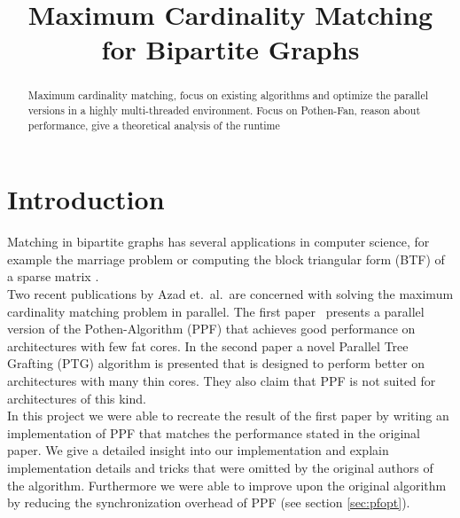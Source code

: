 \documentclass[letterpaper]{article}
\title{Maximum Cardinality Matching for Bipartite Graphs}
\begin{document}
%
\maketitle
%


\begin{abstract}

Maximum cardinality matching, focus on existing algorithms and optimize the parallel versions in a highly multi-threaded environment. Focus on Pothen-Fan, reason about performance, give a theoretical analysis of the runtime

\end{abstract}

\section{Introduction}\label{sec:intro}

Matching in bipartite graphs has several applications in computer science, for example the marriage problem or computing the block triangular 
form (BTF) of a sparse matrix \cite{Pothen:1990}.\\

Two recent publications by Azad et.\ al.\ are concerned with solving the maximum cardinality matching problem in parallel. 
The first paper~\cite{Azad:2012} presents a parallel version of the Pothen-Algorithm (PPF) that achieves good performance 
on architectures with few fat cores. In the second paper a novel Parallel Tree Grafting (PTG) algorithm is presented 
that is designed to perform better on architectures with many thin cores. 
They also claim that PPF is not suited for architectures of this kind.\\

In this project we were able to recreate the result of the first paper \cite{Azad:2012} by writing an implementation of PPF
that matches the performance stated in the original paper. We give a detailed insight into our implementation and explain
implementation details and tricks that were omitted by the original authors of the algorithm. 
Furthermore we were able to improve upon the original algorithm by reducing the synchronization overhead of PPF (see section \ref{sec:pfopt}).\\
\end{document}
